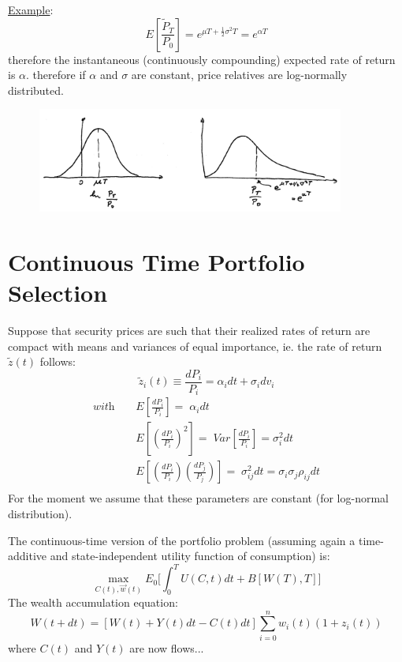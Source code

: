 \documentclass[
14pt,notheorems,hyperref={pdfauthor=whatever}
]{beamer}
\begin{document}
\begin{frame}
\underline{Example}: 
\[E[\frac{\tilde P_T}{P_0}]=e^{\mu T +\frac{1}{2}\sigma^2T} = e^{\alpha T}\]
therefore the instantaneous (continuously compounding) expected rate of return is $\alpha$.
therefore if $\alpha$ and $\sigma$ are constant, price relatives are log-normally distributed.
\begin{figure}[diffusion]
    \includegraphics[width=0.9\textwidth]{images/L8-lognormal.png}
    \centering
\end{figure}
\end{frame}

\section{Continuous Time Portfolio Selection}
\begin{frame}
Suppose that security prices are such that their realized rates of return are compact with means and variances of equal importance, ie. the rate of return $\tilde z(t)$ follows:
\begin{equation}
    \tilde z_i(t) \equiv \frac{dP_i}{P_i} = \alpha_i dt + \sigma_i dv_i
\end{equation}
\begin{align*}
    \textit{with}\;\;\;\; &E[\frac{dP_i}{P_i}] =\; \alpha_i dt\\
    &E[(\frac{dP_i}{P_i})^2] =\; Var[\frac{dP_i}{P_i}] = \sigma_i^2 dt\\
    &E[(\frac{dP_i}{P_i})(\frac{dP_j}{P_j})] =\; \sigma_{ij}^2 dt = \sigma_i \sigma_j \rho_{ij} dt\\
\end{align*}
For the moment we assume that these parameters are constant (for log-normal distribution).\\
\end{frame}

\begin{frame}
The continuous-time version of the portfolio problem (assuming again a time-additive and state-independent utility function of consumption) is:\\
\begin{equation} \tag{2}
    \max_{C(t),\vec{w}(t)} E_0\bigg[\int_0^T U(C,t)dt + B[W(T),T]\bigg]
\end{equation}
The wealth accumulation equation:\\
\begin{equation} \tag{3}
    W(t+dt) = [W(t)+Y(t)dt-C(t)dt] \sum_{i=0}^n w_i(t)(1+z_i(t))
\end{equation}
where $C(t)$ and $Y(t)$ are now flows...
\end{frame}
\end{document}
